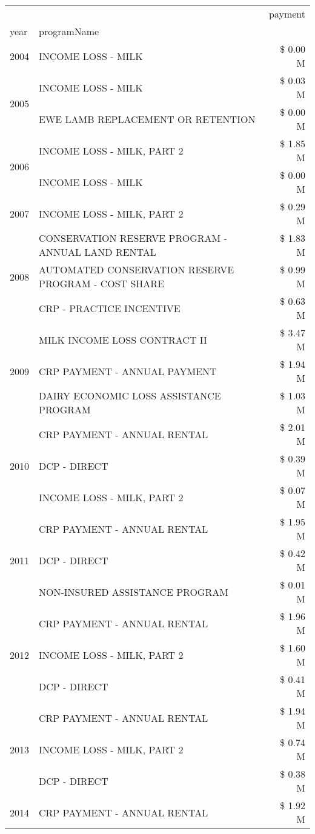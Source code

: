 \begin{tabular}{llr}
\toprule
 &  & payment \\
year & programName &  \\
\midrule
2004 & INCOME LOSS - MILK & \$ 0.00 M \\
\cline{1-3}
\multirow[t]{2}{*}{2005} & INCOME LOSS - MILK & \$ 0.03 M \\
 & EWE LAMB REPLACEMENT OR RETENTION & \$ 0.00 M \\
\cline{1-3}
\multirow[t]{2}{*}{2006} & INCOME LOSS - MILK, PART 2 & \$ 1.85 M \\
 & INCOME LOSS - MILK & \$ 0.00 M \\
\cline{1-3}
2007 & INCOME LOSS - MILK, PART 2 & \$ 0.29 M \\
\cline{1-3}
\multirow[t]{3}{*}{2008} & CONSERVATION RESERVE PROGRAM - ANNUAL LAND RENTAL & \$ 1.83 M \\
 & AUTOMATED CONSERVATION RESERVE PROGRAM - COST SHARE & \$ 0.99 M \\
 & CRP - PRACTICE INCENTIVE & \$ 0.63 M \\
\cline{1-3}
\multirow[t]{3}{*}{2009} & MILK INCOME LOSS CONTRACT II & \$ 3.47 M \\
 & CRP PAYMENT - ANNUAL PAYMENT & \$ 1.94 M \\
 & DAIRY ECONOMIC LOSS ASSISTANCE PROGRAM & \$ 1.03 M \\
\cline{1-3}
\multirow[t]{3}{*}{2010} & CRP PAYMENT - ANNUAL RENTAL & \$ 2.01 M \\
 & DCP - DIRECT & \$ 0.39 M \\
 & INCOME LOSS - MILK, PART 2 & \$ 0.07 M \\
\cline{1-3}
\multirow[t]{3}{*}{2011} & CRP PAYMENT - ANNUAL RENTAL & \$ 1.95 M \\
 & DCP - DIRECT & \$ 0.42 M \\
 & NON-INSURED ASSISTANCE PROGRAM & \$ 0.01 M \\
\cline{1-3}
\multirow[t]{3}{*}{2012} & CRP PAYMENT - ANNUAL RENTAL & \$ 1.96 M \\
 & INCOME LOSS - MILK, PART 2 & \$ 1.60 M \\
 & DCP - DIRECT & \$ 0.41 M \\
\cline{1-3}
\multirow[t]{3}{*}{2013} & CRP PAYMENT - ANNUAL RENTAL & \$ 1.94 M \\
 & INCOME LOSS - MILK, PART 2 & \$ 0.74 M \\
 & DCP - DIRECT & \$ 0.38 M \\
\cline{1-3}
\multirow[t]{3}{*}{2014} & CRP PAYMENT - ANNUAL RENTAL & \$ 1.92 M \\

\end{tabular}

